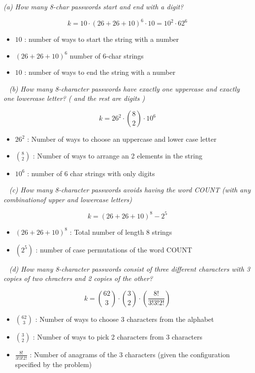 \documentclass[12pt, letterpaper]{article}
\begin{document}
\it{ (a) How many 8-char passwords start and end with a digit?  }

\[ k = 10\cdot (26 + 26 + 10)^{6} \cdot 10 = 10^{2} \cdot 62^{6}\]

\begin{itemize}
    \item \(10\) : number of ways to start the string with a number
    \item \((26 + 26 + 10)^{6}\) number of 6-char strings
    \item \(10 \) : number of ways to end the string with  a number
\end{itemize} 

\-\ \newline
\it{ (b) How many 8-character passwords have exactly one uppercase and exactly one lowercase letter?  ( and the rest are digits ) }

\[ k = 26^{2} \cdot {8 \choose 2} \cdot 10^{6} \]

\begin{itemize}
    \item \(26^{2}\) : Number of ways to choose an uppercase and lower case letter
    \item \( {8 \choose 2} \) : Number of ways to arrange an 2 elements in the string
    \item \(10^{6} \) : number of 6 char strings with only digits
\end{itemize}


\-\ \newline
\it{ (c) How many 8-character passwords avoids having the word COUNT (with any combinationof upper and lowercase letters)  }

\[ k = (26 + 26 + 10)^{8} - 2^{5} \]

\begin{itemize}
    \item \((26 + 26 + 10)^{8}\) : Total number of length 8 strings
    \item \((2^{5}) \) : number of case permutations of the word COUNT
\end{itemize}

\-\ \newline
\it{ (d) How many 8-character passwords consist of three different characters with 3 copies of two chracters and 2 copies of the other?  }

\[ k = {62 \choose 3} \cdot {3 \choose 2} \cdot \left( \dfrac{8!}{3!3!2!} \right) \]

\begin{itemize}
    \item \(62 \choose 3\) : Number of ways to choose 3 characters from the alphabet
    \item \(3 \choose 2\) : Number of ways to pick 2 characters from 3 characters
    \item \(\frac{8!}{3!3!2!}  \) : Number of anagrams of the 3 characters (given the configuration specified by the problem)
\end{itemize}
\end{document}
